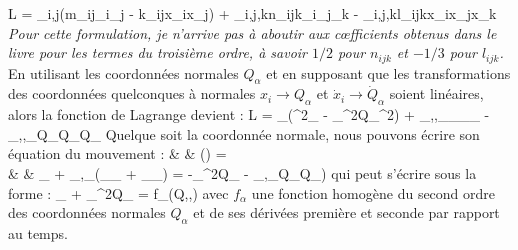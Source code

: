 \be
	L = \sum_{i,j}(m_{ij}_{i}_{j} - k_{ij}x_{i}x_{j}) + \sum_{i,j,k}n_{ijk}_{i}_{j}_{k} - \sum_{i,j,k}l_{ijk}x_{i}x_{j}x_{k}\label{EQ:28_1}
\ee
\emph{Pour cette formulation, je n'arrive pas \`{a} aboutir aux c{\oe}fficients obtenus dans le livre pour les termes du troisi\`{e}me ordre, \`{a} savoir $1/2$ pour $n_{ijk}$ et $-1/3$ pour $l_{ijk}$.}
En utilisant les coordonn\'{e}es normales $Q_{\alpha}$ et en supposant que les transformations des coordonn\'{e}es quelconques \`{a} normales $x_{i} \rightarrow Q_{\alpha}$ et $\dot{x}_{i} \rightarrow \dot{Q}_{\alpha}$ soient lin\'{e}aires, alors la fonction de Lagrange devient :
\be
	L = \sum_{\alpha}(^{2}_{\alpha} - \omega_{\alpha}^{2}Q_{\alpha}^{2}) + \sum_{\alpha,\beta,\gamma}\lambda_{\alpha\beta\gamma}_{\alpha}_{\beta}_{\gamma} - \sum_{\alpha,\beta,\gamma}\mu_{\alpha\beta\gamma}Q_{\alpha}Q_{\beta}Q_{\gamma}\label{EQ:28_2}
\ee
Quelque soit la coordonn\'{e}e normale, nous pouvons \'{e}crire son \'{e}quation du mouvement :
\bea
	& \forall\alpha\text{, } & \left(\right) =  \nonumber \\
	& \Leftrightarrow & _{\alpha} + \sum_{\beta,\gamma}\lambda_{\alpha\beta\gamma}(_{\beta}_{\gamma} + _{\beta}_{\gamma}) = -\omega_{\alpha}^{2}Q_{\alpha}  - \sum_{\beta,\gamma}\mu_{\alpha\beta\gamma}Q_{\beta}Q_{\gamma}) \nonumber
\eea
qui peut s'\'{e}crire sous la forme :
\be
	\forall\alpha\text{, }_{\alpha} + \omega_{\alpha}^{2}Q_{\alpha} = f_{\alpha}(Q,,)\label{EQ:28_3}
\ee
avec $f_{\alpha}$ une fonction homog\`{e}ne du second ordre des coordonn\'{e}es normales $Q_{\alpha}$ et de ses d\'{e}riv\'{e}es premi\`{e}re et seconde par rapport au temps.

